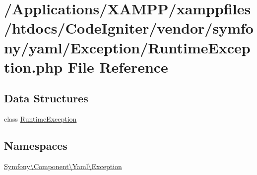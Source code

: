 \hypertarget{symfony_2yaml_2_exception_2_runtime_exception_8php}{}\section{/\+Applications/\+X\+A\+M\+P\+P/xamppfiles/htdocs/\+Code\+Igniter/vendor/symfony/yaml/\+Exception/\+Runtime\+Exception.php File Reference}
\label{symfony_2yaml_2_exception_2_runtime_exception_8php}
\subsection*{Data Structures}
\begin{DoxyCompactItemize}
\item 
class \mbox{\hyperlink{class_symfony_1_1_component_1_1_yaml_1_1_exception_1_1_runtime_exception}{Runtime\+Exception}}
\end{DoxyCompactItemize}
\subsection*{Namespaces}
\begin{DoxyCompactItemize}
\item 
 \mbox{\hyperlink{namespace_symfony_1_1_component_1_1_yaml_1_1_exception}{Symfony\textbackslash{}\+Component\textbackslash{}\+Yaml\textbackslash{}\+Exception}}
\end{DoxyCompactItemize}
